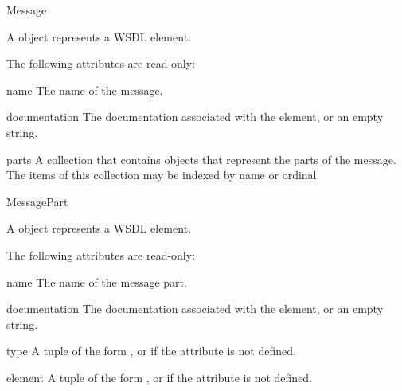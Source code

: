 \begin{classdesc}{Message}{}

A  object represents a WSDL  element.

The following attributes are read-only:

\begin{memberdesc}{name}
The name of the message.
\end{memberdesc}

\begin{memberdesc}{documentation}
The documentation associated with the element, or an empty string.
\end{memberdesc}

\begin{memberdesc}{parts}
A collection that contains  objects that represent the 
parts of the message. The items of this collection may be indexed 
by name or ordinal. 
\end{memberdesc}
\end{classdesc}


\begin{classdesc}{MessagePart}{}

A  object represents a WSDL  element.

The following attributes are read-only:

\begin{memberdesc}{name}
The name of the message part.
\end{memberdesc}

\begin{memberdesc}{documentation}
The documentation associated with the element, or an empty string.
\end{memberdesc}

\begin{memberdesc}{type}
A tuple of the form , or  
if the  attribute is not defined.
\end{memberdesc}

\begin{memberdesc}{element}
A tuple of the form , or  
if the  attribute is not defined.
\end{memberdesc}
\end{classdesc}


